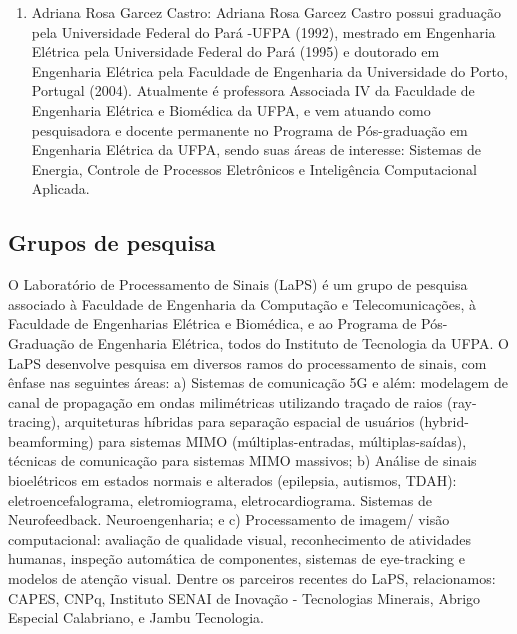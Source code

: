 \begin{enumerate}
\item Adriana Rosa Garcez Castro: Adriana Rosa Garcez Castro possui graduação pela Universidade Federal do Pará -UFPA (1992), mestrado em Engenharia Elétrica pela Universidade Federal do Pará (1995) e doutorado em Engenharia Elétrica pela Faculdade de Engenharia da Universidade do Porto, Portugal (2004). Atualmente é professora Associada IV da Faculdade de Engenharia Elétrica e Biomédica da UFPA, e vem atuando como pesquisadora e docente permanente no Programa de Pós-graduação em Engenharia Elétrica da UFPA, sendo suas áreas de interesse: Sistemas de Energia, Controle de Processos Eletrônicos e Inteligência Computacional Aplicada.

\end{enumerate}

\subsection{Grupos de pesquisa}
\label{ssec:grppesq}
O Laboratório de Processamento de Sinais (LaPS) é um grupo de pesquisa associado à Faculdade de Engenharia da Computação e Telecomunicações,  à Faculdade de Engenharias Elétrica e Biomédica, e ao Programa de Pós-Graduação de Engenharia Elétrica, todos do Instituto de Tecnologia da UFPA. O LaPS desenvolve pesquisa em diversos ramos do processamento de sinais, com ênfase nas seguintes áreas: a) Sistemas de comunicação 5G e além: modelagem de canal de propagação em ondas milimétricas utilizando traçado de raios (ray-tracing), arquiteturas híbridas para separação espacial de usuários (hybrid-beamforming) para sistemas MIMO (múltiplas-entradas, múltiplas-saídas), técnicas de comunicação para sistemas MIMO massivos; b) Análise de sinais bioelétricos em estados normais e alterados (epilepsia, autismos, TDAH): eletroencefalograma, eletromiograma, eletrocardiograma. Sistemas de Neurofeedback. Neuroengenharia; e c) Processamento de imagem/ visão computacional: avaliação de qualidade visual, reconhecimento de atividades humanas, inspeção automática de componentes, sistemas de eye-tracking e modelos de atenção visual. Dentre os parceiros recentes do LaPS, relacionamos: CAPES, CNPq, Instituto SENAI de Inovação - Tecnologias Minerais, Abrigo Especial Calabriano, e Jambu Tecnologia.

